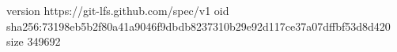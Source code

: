 version https://git-lfs.github.com/spec/v1
oid sha256:73198eb5b2f80a41a9046f9dbdb8237310b29e92d117ce37a07dffbf53d8d420
size 349692
